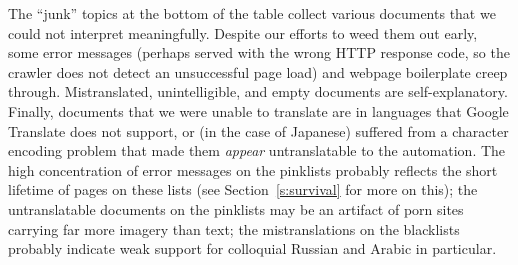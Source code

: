 The “junk” topics at the bottom of the table collect various documents
that we could not interpret meaningfully.  Despite our efforts to weed
them out early, some error messages (perhaps served with the wrong
HTTP response code, so the crawler does not detect an unsuccessful
page load) and webpage boilerplate creep through.  Mistranslated,
unintelligible, and empty documents are self-explanatory.  Finally,
documents that we were unable to translate are in languages that
Google Translate does not support, or (in the case of Japanese)
suffered from a character encoding problem that made them
\emph{appear} untranslatable to the automation.  The high
concentration of error messages on the pinklists probably reflects the
short lifetime of pages on these lists (see Section~\ref{s:survival}
for more on this); the untranslatable documents on the pinklists may
be an artifact of porn sites carrying far more imagery than text; the
mistranslations on the blacklists probably indicate weak support for
colloquial Russian and Arabic in particular.
